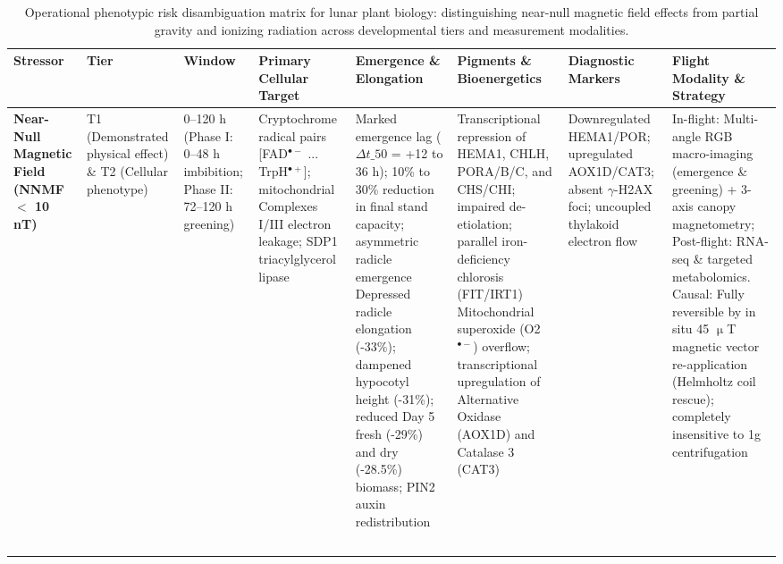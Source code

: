 \begin{table}[t]
\caption{Operational phenotypic risk disambiguation matrix for lunar plant biology: distinguishing near-null magnetic field effects from partial gravity and ionizing radiation across developmental tiers and measurement modalities.}\label{tab:matrix}
\begin{tabular*}{\textwidth}{@{\extracolsep\fill}p{2.0cm}p{1.1cm}p{1.3cm}p{2.3cm}p{2.3cm}p{2.3cm}p{2.4cm}p{2.4cm}@{}}
\toprule
Stressor & Tier & Window & Primary Cellular Target & Emergence \& Elongation & Pigments \& Bioenergetics & Diagnostic Markers & Flight Modality \& Strategy \\
\midrule
\raggedright\scriptsize \textbf{Near-Null Magnetic Field (NNMF $<$ 10 nT)} & \raggedright\scriptsize T1 (Demonstrated physical effect) \& T2 (Cellular phenotype) & \raggedright\scriptsize 0--120 h (Phase I: 0--48 h imbibition; Phase II: 72--120 h greening) & \raggedright\scriptsize Cryptochrome radical pairs [FAD$^{\bullet -}$ ... TrpH$^{\bullet +}$]; mitochondrial Complexes I/III electron leakage; SDP1 triacylglycerol lipase & \raggedright\scriptsize Marked emergence lag ($\Delta$$t\_{50}$ = +12 to 36 h); 10\% to 30\% reduction in final stand capacity; asymmetric radicle emergence Depressed radicle elongation (-33\%); dampened hypocotyl height (-31\%); reduced Day 5 fresh (-29\%) and dry (-28.5\%) biomass; PIN2 auxin redistribution & \raggedright\scriptsize Transcriptional repression of HEMA1, CHLH, PORA/B/C, and CHS/CHI; impaired de-etiolation; parallel iron-deficiency chlorosis (FIT/IRT1) Mitochondrial superoxide (O2$^{\bullet -}$) overflow; transcriptional upregulation of Alternative Oxidase (AOX1D) and Catalase 3 (CAT3) & \raggedright\scriptsize Downregulated HEMA1/POR; upregulated AOX1D/CAT3; absent $\gamma$-H2AX foci; uncoupled thylakoid electron flow & \raggedright\scriptsize In-flight: Multi-angle RGB macro-imaging (emergence \& greening) + 3-axis canopy magnetometry; Post-flight: RNA-seq \& targeted metabolomics. Causal: Fully reversible by in situ 45 $\upmu$T magnetic vector re-application (Helmholtz coil rescue); completely insensitive to 1g centrifugation \\
$$
\end{tabular*}
\end{table}

